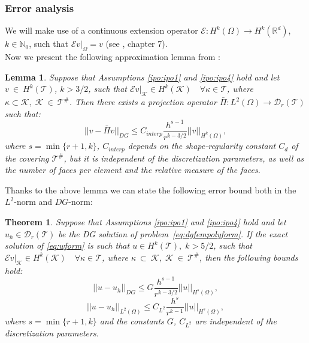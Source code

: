 \documentclass[12pt, a4paper]{article}
\theoremstyle{definition}
\theoremstyle{plain}
\newtheorem{lemma}{Lemma}
\theoremstyle{plain}
\newtheorem{teor}{Theorem}
\theoremstyle{definition}
\begin{document}
\subsubsection{Error analysis}
We will make use of a continuous extension operator 
$\mathcal{E}:H^k(\Omega)\rightarrow 
H^k(\mathbb{R}^d)$, $k\in\mathbb{N}_0$, such that 
$\mathcal{E}v|_\Omega=v$ (see \cite{salsa}, chapter 7).\\
Now we present the following approximation lemma from \cite{multigrid}:
\begin{lemma}  \label{lemma:interp}
	Suppose that Assumptions \ref{ipo:ipo1} and \ref{ipo:ipo4} hold and let 
	$v~\in~H^k(\mathcal{T})$, $k>3/2$, such that 
	$\mathcal{E}v|_\mathcal{K}\in H^k(\mathcal{K}) \quad \forall 
	\kappa\in\mathcal{T}$, where $\kappa\subset\mathcal{K}, \; 
	\mathcal{K}~\in~\mathcal{T}^\#$. Then there exists a projection operator 
	$\bar{\Pi}: L^2(\Omega)\rightarrow\mathcal{D}_r(\mathcal{T})$ such that:
	\begin{equation}
		\big|\!\big| v - \bar{\Pi}v \big|\!\big|_{DG}
		\leq C_{interp} \frac{h^{s-1}}{r^{k-3/2}} |\!| v |\!|_{H^k(\Omega)},
	\end{equation}
	where $s = \min \{r+1, k\}$, $C_{interp}$ depends on the shape-regularity constant $C_d$ of the covering $\mathcal{T}^\#$, but it is independent of the discretization parameters, as well as the number of faces per element and the relative measure of the faces.
\end{lemma}
Thanks to the above lemma we can state the following error bound both in the 
$L^2$-norm and $DG$-norm:
\begin{teor} \label{teo:convergence}
	Suppose that Assumptions \ref{ipo:ipo1} and \ref{ipo:ipo4} hold and let 
	$u_h \in \mathcal{D}_r(\mathcal{T})$ be the DG solution of 
	problem~\eqref{eq:dgfempolyform}. If the exact solution of \eqref{eq:wform} 
	is such that $u\in H^k(\mathcal{T}), \; k>5/2$, such that 
	$\mathcal{E}v|_\mathcal{K}\in H^k(\mathcal{K}) \quad \forall 
	\kappa\in\mathcal{T}$, where $\kappa~\subset~\mathcal{K}, \; 
	\mathcal{K}~\in~\mathcal{T}^\#$, then the following bounds hold:
	\begin{equation} \label{eq:dgbound}
		|\!|u-u_h|\!|_{DG} \leq G \frac{h^{s-1}}{r^{k-3/2}} 
		|\!|u|\!|_{H^s(\Omega)},
	\end{equation}
	\begin{equation} \label{eq:l2bound}
		|\!|u-u_h|\!|_{L^2(\Omega)} \leq C_{L^2} \frac{h^s}{r^{k-1}} 
		|\!|u|\!|_{H^s(\Omega)},
	\end{equation}
	where $s = \min \{r+1, k\}$ and the constants $G$, $C_{L^2}$ are independent of the discretization parameters.
\end{teor}
\end{document}
